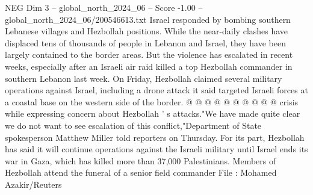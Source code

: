 \begin{textsample}{NEG Dim 3 – global\_north\_2024\_06 – Score -1.00 – global\_north\_2024\_06/200546613.txt}
Israel responded by bombing southern Lebanese villages and Hezbollah positions.
While the near-daily clashes have displaced tens of thousands of people in Lebanon and Israel, they have been largely contained to the border areas.
But the violence has escalated in recent weeks, especially after an Israeli air raid killed a top Hezbollah commander in southern Lebanon last week.
On Friday, Hezbollah claimed several military operations against Israel, including a drone attack it said targeted Israeli forces at a coastal base on the western side of the border. @ @ @ @ @ @ @ @ @ @ crisis while expressing concern about Hezbollah ' s attacks."We have made quite clear we do not want to see escalation of this conflict,"Department of State spokesperson Matthew Miller told reporters on Thursday.
For its part, Hezbollah has said it will continue operations against the Israeli military until Israel ends its war in Gaza, which has killed more than 37,000 Palestinians.
Members of Hezbollah attend the funeral of a senior field commander File : Mohamed Azakir/Reuters

\end{textsample}

